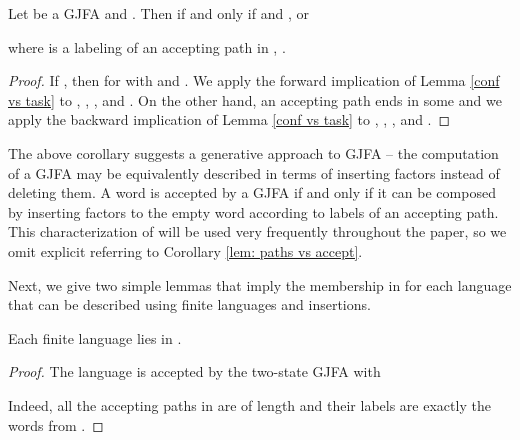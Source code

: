 \documentclass{ws-ijmpc}
\begin{document}
\begin{corollary}
\label{lem: paths vs accept}Let 
be a GJFA and . Then 
if and only if  and , or 

where  is a labeling of an accepting path
in , .\end{corollary}
\begin{proof}
If , then  for 
with  and . We apply the forward
implication of Lemma \ref{conf vs task} to , , , and
. On the other hand, an accepting path ends in some 
and we apply the backward implication of Lemma \ref{conf vs task}
to , , , and .
\end{proof}
The above corollary suggests a generative approach to GJFA -- the
computation of a GJFA may be equivalently described in terms of inserting
factors instead of deleting them. A word is accepted by a GJFA if
and only if it can be composed by inserting factors to the empty word
according to labels of an accepting path. This characterization of
 will be used very frequently throughout
the paper, so we omit explicit referring to Corollary \ref{lem: paths vs accept}.

Next, we give two simple lemmas that imply the membership in 
for each language that can be described using finite languages and
insertions. 
\begin{lemma}
\label{fin sub GJFA}Each finite language 
lies in .\end{lemma}
\begin{proof}
The language  is accepted by the two-state GJFA  with 

Indeed, all the accepting paths in  are of length  and their
labels are exactly the words from . 
\end{proof}
\end{document}

